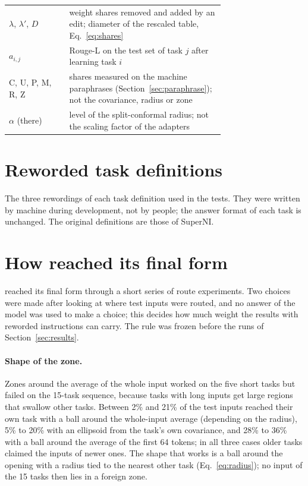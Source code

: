 \begin{table}[H]
\begin{tabular}{lp{0.72\linewidth}}
    $\lambda$, $\lambda'$, $D$ & weight shares removed and added by an edit; diameter of the rescaled table, Eq.~\eqref{eq:shares} \\
        $a_{i,j}$ & Rouge-L on the test set of task $j$ after learning task $i$ \\
    \textsf{C}, \textsf{U}, \textsf{P}, \textsf{M}, \textsf{R}, \textsf{Z} & shares measured on the machine paraphrases (Section~\ref{sec:paraphrase}); not the covariance, radius or zone \\
    $\alpha$ (there) & level of the split-conformal radius; not the scaling factor of the adapters \\
    \bottomrule
  \end{tabular}
\end{table}

\FloatBarrier
\section{Reworded task definitions}
\label{app:rewordings}

The three rewordings of each task definition used in the tests. They were written by machine during development, not by people; the answer format of each task is unchanged. The original
definitions are those of SuperNI.




\FloatBarrier
\section{How \cert{} reached its final form}
\label{app:history}

\cert{} reached its final form through a short series of route experiments. Two choices were made after looking at where test inputs were routed, and no answer of the model was used to make a choice; this decides how much weight the results with reworded instructions can carry. The rule was frozen before the runs of Section~\ref{sec:results}.

\paragraph{Shape of the zone.} Zones around the average of the whole input worked on the five short tasks but failed on the 15-task sequence, because tasks with long inputs get large regions that swallow other tasks. Between 2\% and 21\% of the test inputs reached their own task with a ball around the whole-input average (depending on the radius), 5\% to 20\% with an ellipsoid from the task's own covariance, and 28\% to 36\% with a ball around the average of the first 64 tokens; in all three cases older tasks claimed the inputs of newer ones. The shape that works is a ball around the opening with a radius tied to the nearest other task (Eq.~\ref{eq:radius}); no input of the 15 tasks then lies in a foreign zone.

